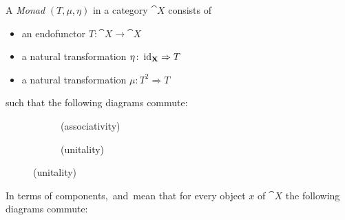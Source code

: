 \begin{definition}[Monad]
A \textit{Monad} $(T,\mu, \eta) $ in a category $\cat{X}$ consists of
\begin{itemize}
    \item an endofunctor $T\colon \cat{X} \to \cat{X}$
    \item a natural transformation $\eta \colon \operatorname{id}_{\mathbf{X}} \Rightarrow T$ 
    \item a natural transformation $\mu\colon T^2 \Rightarrow T $
\end{itemize}  
such that the following diagrams commute: \\
\begin{figure}[H]
    \centering
    \begin{subfigure}{0.3\textwidth}
        \centering
        \label{dia: associativity}
        \caption*{(associativity)}
    \end{subfigure}
    \hspace{2em}
    \begin{subfigure}{0.3\textwidth}
        \centering
        \label{dia: unitality}
        \caption*{(unitality)}
    \end{subfigure} 
\end{figure}

In terms of components,~ and~ mean that for every object $x$ of $\cat{X}$
the following diagrams commute:


\end{definition}

